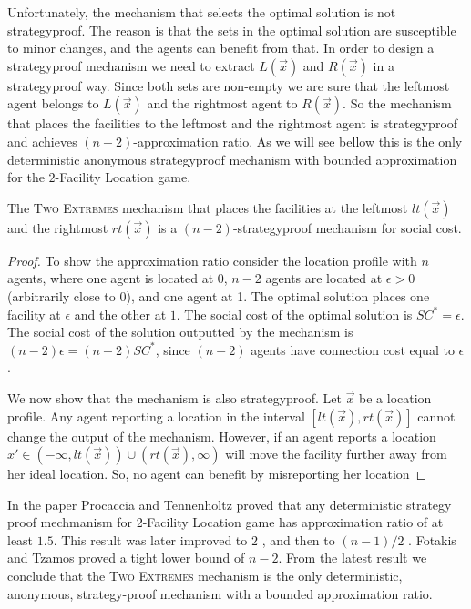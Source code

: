 Unfortunately, the mechanism that selects the optimal solution is not strategyproof. The reason is that the sets in the optimal solution are susceptible to minor changes, and the agents can benefit from that. In order to design a strategyproof mechanism we need to extract $L(\vec{x})$ and $R(\vec{x})$ in a strategyproof way. Since both sets are non-empty we are sure that the leftmost agent belongs to $L(\vec{x})$ and the rightmost agent to $R(\vec{x})$. So the mechanism that places the facilities to the leftmost and the rightmost agent is strategyproof and achieves $(n-2)$-approximation ratio. As we will see bellow this is the only deterministic anonymous strategyproof mechanism with bounded approximation for the $2$-Facility Location game. 

\begin{theorem}
The \textsc{Two Extremes} mechanism that places the facilities at the leftmost $lt(\vec{x})$ and the rightmost $rt(\vec{x})$ is a $(n-2)$-strategyproof mechanism for social cost.
\end{theorem}
\begin{proof}
To show the approximation ratio consider the location profile with $n$ agents, where one agent is located at 0, $n-2$ agents are located at $\epsilon>0$ (arbitrarily close to 0), and one agent at 1. The optimal solution places one facility at $\epsilon$ and the other at $1$. The social cost of the optimal solution is $SC^* = \epsilon$. The social cost of the solution outputted by the mechanism is $(n-2)\epsilon = (n-2) SC^*$, since $(n-2)$ agents have connection cost equal to $\epsilon$.

We now show that the mechanism is also strategyproof. Let $\vec{x}$ be a location profile. Any agent reporting a location in the interval $[lt(\vec{x}),rt(\vec{x})]$ cannot change the output of the mechanism. However, if an agent reports a location $x' \in (-\infty,lt(\vec{x})) \cup (rt(\vec{x}),\infty)$ will move the facility further away from her ideal location. So, no agent can benefit by misreporting her location
\end{proof}




In the paper \cite{Procaccia2013} Procaccia and Tennenholtz proved that any deterministic strategy proof mechmanism for 2-Facility Location game has approximation ratio of at least $1.5$. This result was later improved to $2$ \cite{Lu2009}, and then to $(n-1)/2$ \cite{Lu2010} . Fotakis and Tzamos \cite{Fotakis2014} proved a tight lower bound of $n-2$. From the latest result we conclude that the \textsc{Two Extremes} mechanism is the only deterministic, anonymous, strategy-proof mechanism with a bounded approximation ratio.  


